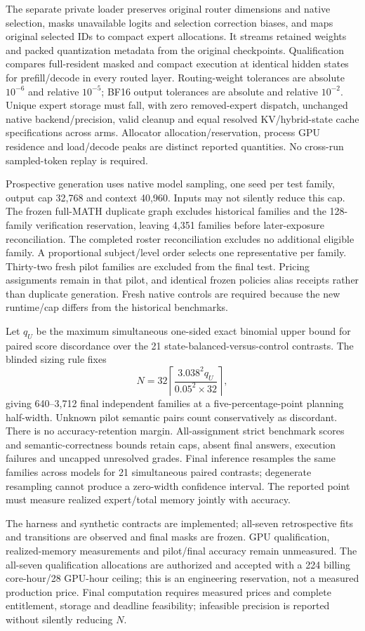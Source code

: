 The separate private loader preserves original router dimensions and native
selection, masks unavailable logits and selection correction biases, and
maps original selected IDs to compact expert allocations. It streams retained
weights and packed quantization metadata from the original checkpoints.
Qualification compares full-resident masked and compact execution at identical
hidden states for prefill/decode in every routed layer. Routing-weight
tolerances are absolute $10^{-6}$ and relative $10^{-5}$; BF16 output tolerances
are absolute and relative $10^{-2}$. Unique expert storage must fall, with zero
removed-expert dispatch, unchanged native backend/precision, valid cleanup
and equal resolved KV/hybrid-state cache specifications across arms. Allocator
allocation/reservation, process GPU residence and load/decode peaks are
distinct reported quantities. No cross-run sampled-token replay is required.

Prospective generation uses native model sampling, one seed per test family,
output cap 32,768 and context 40,960. Inputs may not silently reduce this cap.
The frozen full-MATH duplicate graph excludes historical families and the
128-family verification reservation, leaving 4,351 families before later-exposure
reconciliation. The completed roster reconciliation excludes no additional
eligible family. A proportional subject/level order selects one representative
per family. Thirty-two fresh pilot families are excluded from the final test.
Pricing assignments remain in that pilot, and identical frozen policies alias
receipts rather than duplicate generation. Fresh native controls are required
because the new runtime/cap differs from the historical benchmarks.

Let $q_U$ be the maximum simultaneous one-sided exact binomial upper bound for
paired score discordance over the 21 state-balanced-versus-control contrasts.
The blinded sizing rule fixes
\begin{equation}
 N=32\left\lceil\frac{3.038^2q_U}{0.05^2\times32}\right\rceil,
\end{equation}
giving 640--3,712 final independent families at a five-percentage-point planning
half-width. Unknown pilot semantic pairs count conservatively as discordant.
There is no accuracy-retention margin. All-assignment strict benchmark scores
and semantic-correctness bounds retain caps, absent final answers, execution
failures and uncapped unresolved grades. Final inference resamples the same
families across models for 21 simultaneous paired contrasts; degenerate
resampling cannot produce a zero-width confidence interval. The reported
point must measure realized expert/total memory jointly with accuracy.

The harness and synthetic contracts are implemented; all-seven retrospective
fits and transitions are observed and final masks are frozen. GPU qualification,
realized-memory measurements and pilot/final accuracy remain unmeasured.
The all-seven qualification allocations are authorized and accepted with a
224 billing core-hour/28 GPU-hour ceiling; this is an engineering reservation,
not a measured production price. Final computation requires measured prices and
complete entitlement, storage and deadline feasibility; infeasible precision
is reported without silently reducing $N$.
